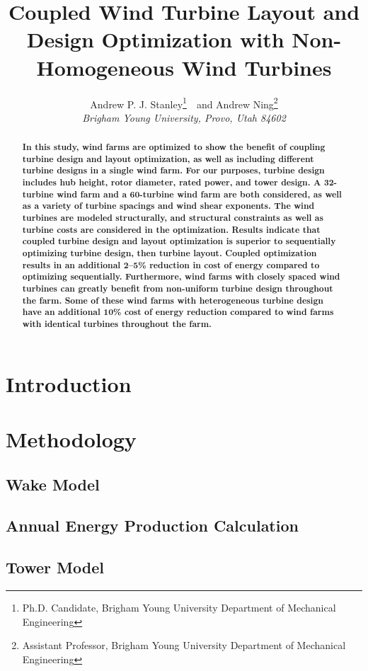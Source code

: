 \documentclass[]{aiaa-tc}
\title{Coupled Wind Turbine Layout and Design Optimization with Non-Homogeneous Wind Turbines}
\author{
  Andrew P. J. Stanley\thanks{Ph.D. Candidate, Brigham Young University Department of Mechanical Engineering}\ \ and Andrew Ning\thanks{Assistant Professor, Brigham Young University Department of Mechanical Engineering}
  \\
  \smallskip
                         {\normalsize\itshape
   Brigham Young University, Provo, Utah 84602}\\}
\begin{document}
\maketitle{}
\begin{abstract}
\textbf{In this study, wind farms are optimized to show the benefit of coupling turbine design and layout optimization, as well as including different turbine designs in a single wind farm. For our purposes, turbine design includes hub height, rotor diameter, rated power, and tower design. A 32-turbine wind farm and a 60-turbine wind farm are both considered, as well as a variety of turbine spacings and wind shear exponents. The wind turbines are modeled structurally, and structural constraints as well as turbine costs are considered in the optimization. Results indicate that coupled turbine design and layout optimization is superior to sequentially optimizing turbine design, then turbine layout. Coupled optimization results in an additional  2--5\% reduction in cost of energy compared to optimizing sequentially. Furthermore, wind farms with closely spaced wind turbines can greatly benefit from non-uniform turbine design throughout the farm. Some of these wind farms with heterogeneous turbine design have an additional 10\% cost of energy reduction compared to wind farms with identical turbines throughout the farm. }
\end{abstract}


\section{Introduction}





\section{Methodology}

\subsection{Wake Model}

      
\subsection{Annual Energy Production Calculation}


\subsection{Tower Model}

\end{document}

